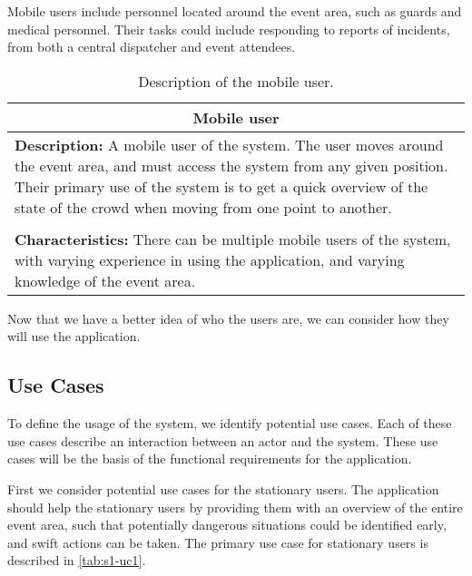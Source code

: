 Mobile users include personnel located around the event area, such as guards and medical personnel. Their tasks could include responding to reports of incidents, from both a central dispatcher and event attendees.

\begin{table}[h!]
    \centering
    \begin{tabularx}{/4}{X}
        \toprule
        \multicolumn{1}{c}{\textbf{Mobile user}} \\ 
        \midrule
        \textbf{Description:} A mobile user of the system. The user moves around the event area, and must access the system from any given position. Their primary use of the system is to get a quick overview of the state of the crowd when moving from one point to another. \\
        \\
        \textbf{Characteristics:} There can be multiple mobile users of the system, with varying experience in using the application, and varying knowledge of the event area. \\
        \bottomrule
    \end{tabularx}
    \caption{Description of the mobile user.}
    \label{tab:mob_user}
\end{table}

Now that we have a better idea of who the users are, we can consider how they will use the application.

\subsection{Use Cases} \label{ss:s1_uc}
To define the usage of the system, we identify potential use cases. Each of these use cases describe an interaction between an actor and the system. These use cases will be the basis of the functional requirements for the application.

First we consider potential use cases for the stationary users. The application should help the stationary users by providing them with an overview of the entire event area, such that potentially dangerous situations could be identified early, and swift actions can be taken. The primary use case for stationary users is described in \cref{tab:s1-uc1}.

